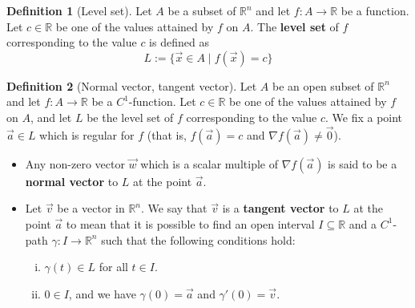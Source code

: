 \documentclass[11pt]{article}
\theoremstyle{definition}
\newtheorem*{defn*}{Definition}
\newcommand{\R}{\ensuremath{\mathbb{R}}}
\begin{document}
\begin{defn*}[Level set]
Let $A$ be a subset of $\R^n$ and let $f : A \to \R$ be a function. Let $c \in \R$ be one of the values attained by $f$ on $A$. The {\bf level set} of $f$ corresponding to the value $c$ is defined as
$$L := \{\vec{x} \in A \mid f(\vec{x}) = c\}$$
\end{defn*}

\begin{defn*}[Normal vector, tangent vector]
Let $A$ be an open subset of $\R^n$ and let $f : A \to \R$ be a $C^1$-function. Let $c \in \R$ be one of the values attained by $f$ on $A$, and let $L$ be the level set of $f$ corresponding to the value $c$. We fix a point $\vec{a} \in L$ which is regular for $f$ (that is, $f(\vec{a}) = c$ and $\nabla f(\vec{a}) \neq \vec{0}$).
\vspace{-1.5ex}\begin{itemize}
    \item Any non-zero vector $\vec{w}$ which is a scalar multiple of $\nabla f(\vec{a})$ is said to be a {\bf normal vector} to $L$ at the point $\vec{a}$.
    \item Let $\vec{v}$ be a vector in $\R^n$. We say that $\vec{v}$ is a {\bf tangent vector} to $L$ at the point $\vec{a}$ to mean that it is possible to find an open interval $I \subseteq \R$ and a $C^1$-path $\gamma : I \to \R^n$ such that the following conditions hold:
    \vspace{-1ex}\begin{enumerate}[(i)]
        \item $\gamma(t) \in L$ for all $t \in I$.
        \item $0 \in I$, and we have $\gamma(0) = \vec{a}$ and $\gamma'(0) = \vec{v}$.
    \end{enumerate}\vspace{-1ex}
\end{itemize}\vspace{-1.5ex}
\end{defn*}
\end{document}
